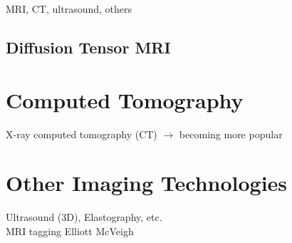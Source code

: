 MRI, CT, ultrasound, others \\

\subsection{Diffusion Tensor MRI}
\label{Diffusion Tensor MRI}

\section{Computed Tomography}
\label{Computed Tomography}
X-ray computed tomography (CT) $\rightarrow$ becoming more popular \\
\section{Other Imaging Technologies}
\label{Other Imaging Technologies}
Ultrasound (3D), Elastography, etc. \\
MRI tagging Elliott McVeigh
